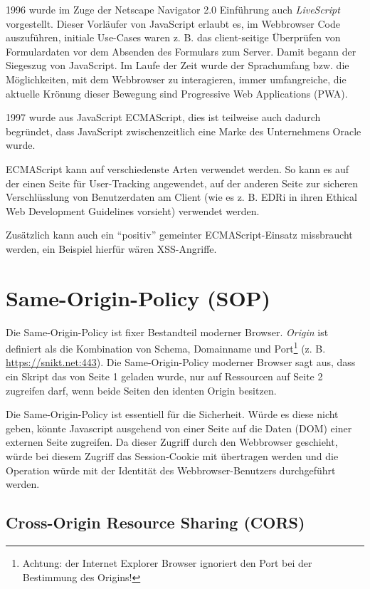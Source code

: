 1996 wurde im Zuge der Netscape Navigator 2.0 Einführung auch \textit{LiveScript} vorgestellt. Dieser Vorläufer von JavaScript erlaubt es, im Webbrowser Code auszuführen, initiale Use-Cases waren z. B. das client-seitige Überprüfen von Formulardaten vor dem Absenden des Formulars zum Server. Damit begann der Siegeszug von JavaScript. Im Laufe der Zeit wurde der Sprachumfang bzw. die Möglichkeiten, mit dem Webbrowser zu interagieren, immer umfangreiche, die aktuelle Krönung dieser Bewegung sind Progressive Web Applications (PWA).

1997 wurde aus JavaScript ECMAScript, dies ist teilweise auch dadurch begründet, dass JavaScript zwischenzeitlich eine Marke des Unternehmens Oracle wurde.

ECMAScript kann auf verschiedenste Arten verwendet werden. So kann es auf der einen Seite für User-Tracking angewendet, auf der anderen Seite zur sicheren Verschlüsslung von Benutzerdaten am Client (wie es z. B. EDRi in ihren Ethical Web Development Guidelines vorsieht) verwendet werden.

Zusätzlich kann auch ein ``positiv'' gemeinter ECMAScript-Einsatz missbraucht werden, ein Beispiel hierfür wären XSS-Angriffe.

\section{Same-Origin-Policy (SOP)}

Die Same-Origin-Policy ist fixer Bestandteil moderner Browser. \textit{Origin} ist definiert als die Kombination von Schema, Domainname und Port\footnote{Achtung: der Internet Explorer Browser ignoriert den Port bei der Bestimmung des Origins!} (z. B. \url{https://snikt.net:443}). Die Same-Origin-Policy moderner Browser sagt aus, dass ein Skript das von Seite 1 geladen wurde, nur auf Ressourcen auf Seite 2 zugreifen darf, wenn beide Seiten den identen Origin besitzen.

Die Same-Origin-Policy ist essentiell für die Sicherheit. Würde es diese nicht geben, könnte Javascript ausgehend von einer Seite auf die Daten (DOM) einer externen Seite zugreifen. Da dieser Zugriff durch den Webbrowser geschieht, würde bei diesem Zugriff das Session-Cookie mit übertragen werden und die Operation würde mit der Identität des Webbrowser-Benutzers durchgeführt werden.

\subsection{Cross-Origin Resource Sharing (CORS)}

